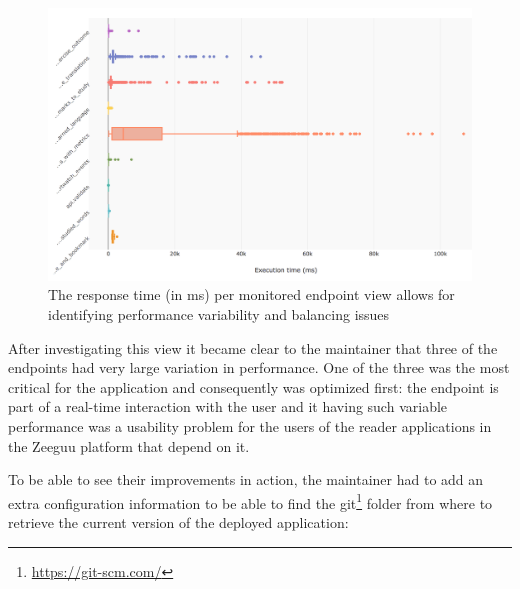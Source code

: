 \documentclass[conference]{IEEEtran}
\begin{document}

  \begin{figure}[!ht]
    \centering
    \includegraphics[width=\linewidth]{endpoint_performance.png}
    \caption{The response time (in ms) per monitored endpoint view allows for identifying performance variability and balancing issues}
    \label{fig:ep}
  \end{figure}

  After investigating this view it became clear to the maintainer that three of the endpoints had very large variation in performance. One of the three was the most critical for the application and consequently was optimized first: the \epTranslations endpoint is part of a real-time interaction with the user and it having such variable performance was a usability problem for the users of the reader applications in the Zeeguu platform that depend on it. 



  \niceseparator

  To be able to see their improvements in action, the maintainer had to add an extra configuration information to be able to find the git\footnote{\url{https://git-scm.com/}} folder from where to retrieve the current version of the deployed application: 
\end{document}
